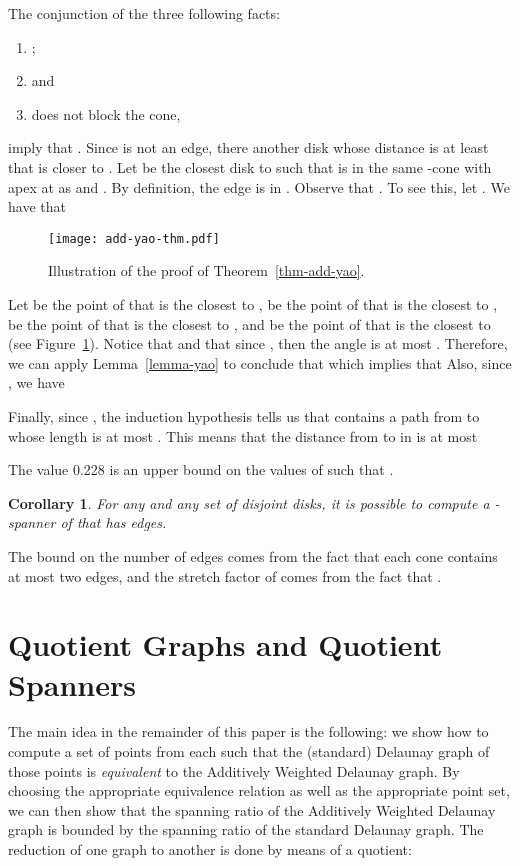 \documentclass[pdftex,leqno,fleqn,12pt]{article}
\newtheorem{corollary}[theorem]{Corollary}
\newenvironment{proof}{{\textit Proof:} \rm}{\hfill  \medskip\\}
\begin{document}
\begin{proof}
The conjunction of the three following facts:
\begin{enumerate}
\item ;
\item  and
\item  does not block the cone,
\end{enumerate}
imply that . Since  is not an edge, there another
disk whose distance is at least  that is closer to . Let
 be the closest disk to  such that  is in the same
-cone with apex at  as  and . By
definition, the edge  is in .  Observe
that . To see this, let . We have
that 
\begin{figure} \centering\texttt{[image: add-yao-thm.pdf]}\caption{Illustration
of the proof of Theorem~\ref{thm-add-yao}.}\label{fig-add-yao} \end{figure}
Let  be the point of  that is the closest to ,  be the
point of  that is the closest to ,  be the point of  that
is the closest to , and  be the point of  that is the closest
to  (see Figure~\ref{fig-add-yao}). Notice that  and that since , then the angle
 is at most .  Therefore, we can apply
Lemma~\ref{lemma-yao} to conclude that  which implies that  Also, since
, we have


Finally, since , the induction hypothesis tells us that
 contains a path from  to  whose length is at most
. This means that the distance from  to  in  is at
most

The value 0.228 is an upper bound on the values of  such that .
\end{proof}



\begin{corollary} For any  and any set  of  disjoint disks, it is
possible to compute a -spanner of  that has  edges.
\end{corollary}
\begin{proof} The bound on the number of edges comes from the fact that each cone contains at most
two edges, and the stretch factor of  comes from the fact that
.
\end{proof}

\section{Quotient Graphs and Quotient Spanners}\label{section-disk-del-quotient}

The main idea in the remainder of this paper is the following: we show how to compute a set of points
from each  such that the (standard) Delaunay graph of those points is \emph{equivalent} to the
Additively Weighted Delaunay graph. By choosing the appropriate equivalence relation as well as the
appropriate point set, we can then show that the spanning ratio of the Additively Weighted Delaunay
graph is bounded by the spanning ratio of the standard Delaunay graph. The reduction of one graph
to another is done by means of a quotient:
\end{document}
